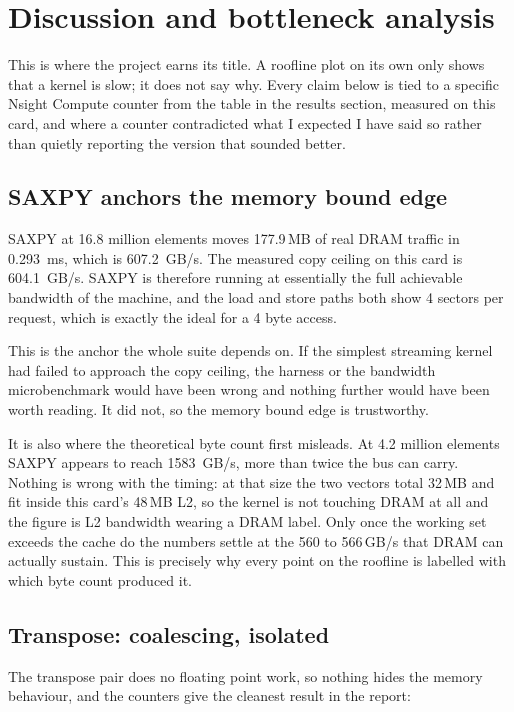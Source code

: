 \section{Discussion and bottleneck analysis}

This is where the project earns its title. A roofline plot on its own only shows
that a kernel is slow; it does not say why. Every claim below is tied to a
specific Nsight Compute counter from the table in the results section, measured
on this card, and where a counter contradicted what I expected I have said so
rather than quietly reporting the version that sounded better.

\subsection{SAXPY anchors the memory bound edge}

SAXPY at 16.8 million elements moves 177.9\,MB of real DRAM traffic in
\SI{0.293}{\milli\second}, which is \SI{607.2}{GB/s}. The measured copy ceiling
on this card is \SI{604.1}{GB/s}. SAXPY is therefore running at essentially the
full achievable bandwidth of the machine, and the load and store paths both show
4 sectors per request, which is exactly the ideal for a 4 byte access.

This is the anchor the whole suite depends on. If the simplest streaming kernel
had failed to approach the copy ceiling, the harness or the bandwidth
microbenchmark would have been wrong and nothing further would have been worth
reading. It did not, so the memory bound edge is trustworthy.

It is also where the theoretical byte count first misleads. At 4.2 million
elements SAXPY appears to reach \SI{1583}{GB/s}, more than twice the bus can
carry. Nothing is wrong with the timing: at that size the two vectors total
32\,MB and fit inside this card's 48\,MB L2, so the kernel is not touching DRAM
at all and the figure is L2 bandwidth wearing a DRAM label. Only once the working
set exceeds the cache do the numbers settle at the 560 to 566\,GB/s that DRAM can
actually sustain. This is precisely why every point on the roofline is labelled
with which byte count produced it.

\subsection{Transpose: coalescing, isolated}

The transpose pair does no floating point work, so nothing hides the memory
behaviour, and the counters give the cleanest result in the report:

